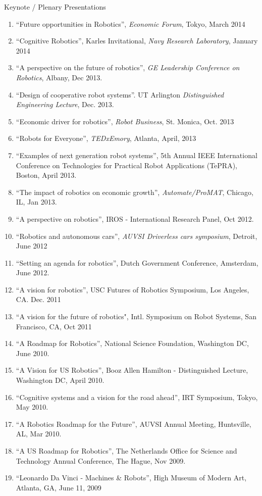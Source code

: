 \documentclass{article}
\begin{document}
\begin{cv}
\begin{cvlist}{Keynote / Plenary Presentations}
\begin{enumerate}
  \item ``Future opportunities in Robotics'', {\em Economic Forum}, Tokyo, March 2014
  \item ``Cognitive Robotics'', Karles Invitational, {\em Navy Research Laboratory}, January 2014
  \item ``A perspective on the future of robotics'', {\em GE Leadership Conference on Robotics}, Albany, Dec 2013.
  \item ``Design of cooperative robot systems''. UT Arlington {\em Distinguished Engineering Lecture}, Dec. 2013.
  \item ``Economic driver for robotics'', {\em Robot Business}, St. Monica,  Oct. 2013
  \item ``Robots for Everyone'', {\em TEDxEmory}, Atlanta, April, 2013
  \item ``Examples of next generation robot systems'', 5th Annual IEEE
    International Conference on Technologies for Practical Robot
    Applications (TePRA), Boston, April 2013.
  \item ``The impact of robotics on economic growth'', {\em Automate/ProMAT}, Chicago, IL, Jan 2013.
  \item ``A perspective on robotics'', IROS - International Research  Panel, Oct 2012.
  \item ``Robotics and autonomous cars'', {\em AUVSI Driverless cars symposium}, Detroit, June 2012
  \item ``Setting an agenda for robotics'', Dutch Government  Conference, Amsterdam, June 2012.
  \item ``A vision for robotics'', USC Futures of Robotics Symposium, Los Angeles, CA.  Dec. 2011
  \item ``A vision for the future of robotics", Intl. Symposium on Robot Systems, San Francisco, CA, Oct 2011
  \item ``A Roadmap for Robotics'', National Science Foundation,  Washington DC, June 2010.
  \item ``A Vision for US Robotics'', Booz Allen Hamilton -  Distinguished Lecture, Washington DC, April 2010.
  \item ``Cognitive systems and a vision for the road ahead'', IRT  Symposium, Tokyo, May 2010.
  \item ``A Robotics Roadmap for the Future'', AUVSI Annual Meeting, Huntsville, AL, Mar 2010.
  \item ``A US Roadmap for Robotics'', The Netherlands Office for Science and Technology Annual Conference, The Hague, Nov 2009.
  \item ``Leonardo Da Vinci - Machines \& Robots'', High Museum of Modern Art, Atlanta, GA, June 11, 2009

\end{enumerate}
\end{cvlist}
\end{cv}
\end{document}
